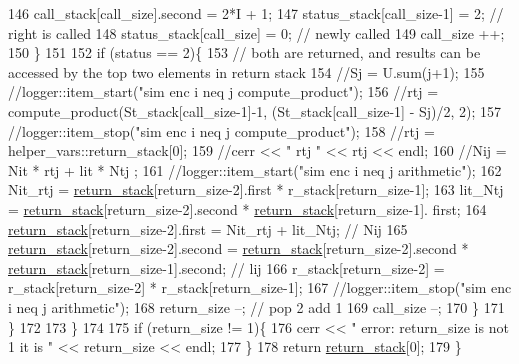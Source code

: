\begin{DoxyCode}
146         call\_stack[call\_size].second = 2*I + 1;
147         status\_stack[call\_size-1] = 2; \textcolor{comment}{// right is called}
148         status\_stack[call\_size] = 0; \textcolor{comment}{// newly called}
149         call\_size ++;
150       \}
151 
152       \textcolor{keywordflow}{if} (status == 2)\{
153         \textcolor{comment}{// both are returned, and results can be accessed by the top two elements in return stack}
154         \textcolor{comment}{//Sj = U.sum(j+1);}
155         \textcolor{comment}{//logger::item\_start("sim enc i neq j compute\_product");}
156         \textcolor{comment}{//rtj = compute\_product(St\_stack[call\_size-1]-1, (St\_stack[call\_size-1] - Sj)/2, 2);}
157         \textcolor{comment}{//logger::item\_stop("sim enc i neq j compute\_product");}
158         \textcolor{comment}{//rtj = helper\_vars::return\_stack[0];}
159         \textcolor{comment}{//cerr << " rtj " << rtj << endl;}
160         \textcolor{comment}{//Nij = Nit * rtj + lit * Ntj ;}
161         \textcolor{comment}{//logger::item\_start("sim enc i neq j arithmetic");}
162         Nit\_rtj = \hyperlink{namespacehelper__vars_a6d2100c373830cacd232319a9958652d}{return\_stack}[return\_size-2].first * r\_stack[return\_size-1];
163         lit\_Ntj = \hyperlink{namespacehelper__vars_a6d2100c373830cacd232319a9958652d}{return\_stack}[return\_size-2].second * \hyperlink{namespacehelper__vars_a6d2100c373830cacd232319a9958652d}{return\_stack}[return\_size-1].
      first;
164         \hyperlink{namespacehelper__vars_a6d2100c373830cacd232319a9958652d}{return\_stack}[return\_size-2].first = Nit\_rtj + lit\_Ntj; \textcolor{comment}{// Nij}
165         \hyperlink{namespacehelper__vars_a6d2100c373830cacd232319a9958652d}{return\_stack}[return\_size-2].second = \hyperlink{namespacehelper__vars_a6d2100c373830cacd232319a9958652d}{return\_stack}[return\_size-2].second * 
      \hyperlink{namespacehelper__vars_a6d2100c373830cacd232319a9958652d}{return\_stack}[return\_size-1].second; \textcolor{comment}{// lij}
166         r\_stack[return\_size-2] = r\_stack[return\_size-2] * r\_stack[return\_size-1];
167         \textcolor{comment}{//logger::item\_stop("sim enc i neq j arithmetic");}
168         return\_size --; \textcolor{comment}{// pop 2 add 1}
169         call\_size --;
170       \}
171     \}
172 
173   \}
174 
175   \textcolor{keywordflow}{if} (return\_size != 1)\{
176     cerr << \textcolor{stringliteral}{" error: return\_size is not 1 it is "} << return\_size << endl;
177   \}
178   \textcolor{keywordflow}{return} \hyperlink{namespacehelper__vars_a6d2100c373830cacd232319a9958652d}{return\_stack}[0];
179 \}
\end{DoxyCode}
\mbox{\label{classgraph__encoder_a23350e4c0986763b24d14c5ef1beb37e}} 
